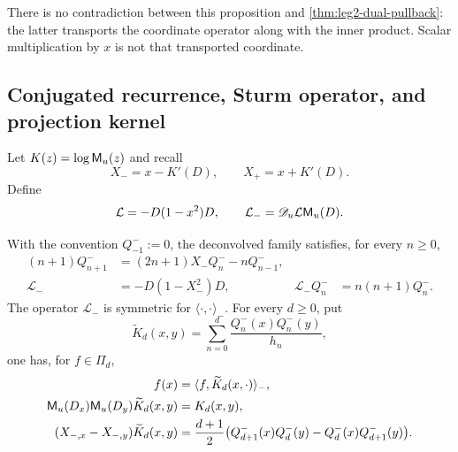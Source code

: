 There is no contradiction between this proposition and
\cref{thm:leg2-dual-pullback}: the latter transports the coordinate operator
along with the inner product.  Scalar multiplication by $x$ is not that
transported coordinate.

\subsection{Conjugated recurrence, Sturm operator, and projection kernel}

Let $K(z)=\log\mathsf M_u(z)$ and recall
\[
 X_-=x-K'(D),\qquad X_+=x+K'(D).
\]
Define
\[
 \mathcal L=-D(1-x^2)D,\qquad
 \mathcal L_-=\mathscr D_u\mathcal L\mathsf M_u(D).
\]

\begin{theorem}
\label{thm:leg2-Q-operator-calculus}
With the convention $Q_{-1}^-:=0$, the deconvolved family satisfies, for
every $n\ge0$,
\begin{align}
 (n+1)Q_{n+1}^-&=(2n+1)X_-Q_n^--nQ_{n-1}^-,
 \label{eq:leg2-Q-recurrence}\\
 \mathcal L_-&=-D(1-X_-^2)D,
 &
 \mathcal L_-Q_n^-&=n(n+1)Q_n^-.
 \label{eq:leg2-Q-sturm}
\end{align}
The operator $\mathcal L_-$ is symmetric for $\langle\cdot,\cdot\rangle_-$.
For every $d\ge0$, put
\begin{equation}
 \widetilde K_d(x,y)=
 \sum_{n=0}^{d}\frac{Q_n^-(x)Q_n^-(y)}{h_n},
 \label{eq:leg2-pullback-kernel}
\end{equation}
one has, for $f\in\Pi_d$,
\begin{align}
 f(x)&=\langle f,\widetilde K_d(x,\cdot)\rangle_-,
 \label{eq:leg2-pullback-reproducing}\\
 \mathsf M_u(D_x)\mathsf M_u(D_y)\widetilde K_d(x,y)&=K_d(x,y),
 \label{eq:leg2-kernel-transmutation}\\
 (X_{-,x}-X_{-,y})\widetilde K_d(x,y)
 &=\frac{d+1}{2}
 \bigl(Q_{d+1}^-(x)Q_d^-(y)-Q_d^-(x)Q_{d+1}^-(y)\bigr).
 \label{eq:leg2-operator-CD}
\end{align}
\end{theorem}

